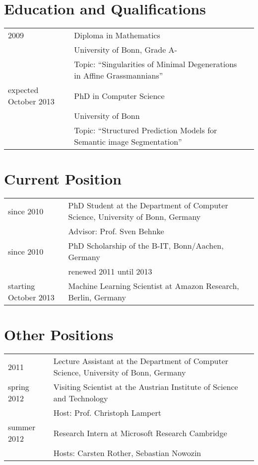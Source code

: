 \documentclass[a4paper,11pt]{article}
\begin{document}
\maketitle

\section{Education and Qualifications}
\begin{tabular}{lll}
    2009 & Diploma in Mathematics \\ & University of Bonn, Grade A-\\
         & Topic: ``Singularities of Minimal Degenerations in Affine Grassmannians'' \\
    expected October 2013 & PhD in Computer Science \\ & University of Bonn \\
         & Topic: ``Structured Prediction Models for Semantic image Segmentation''
\end{tabular}

\section{Current Position}
\begin{tabular}{lll}
    since 2010 & PhD Student at the Department of Computer Science, University of Bonn, Germany\\
               & Advisor: Prof. Sven Behnke\\
    since 2010 & PhD Scholarship of the B-IT, Bonn/Aachen, Germany\\
               & renewed 2011 until 2013\\
    starting October 2013& Machine Learning Scientist at Amazon Research, Berlin, Germany
\end{tabular}

\section{Other Positions}
\begin{tabular}{lll}
    2011 & Lecture Assistant at the Department of Computer Science, University of Bonn, Germany \\
    spring 2012 & Visiting Scientist at the Austrian Institute of Science and Technology\\
               & Host: Prof. Christoph Lampert\\
    summer 2012 & Research Intern at Microsoft Research Cambridge\\
               & Hosts: Carsten Rother, Sebastian Nowozin\\
\end{tabular}
\end{document}

